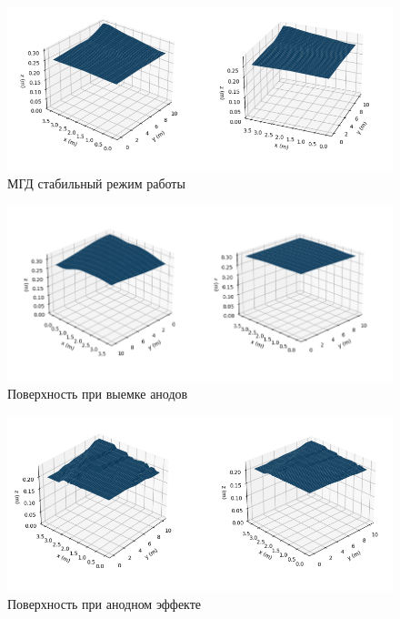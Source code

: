 \documentclass{article}
\begin{document}
\begin{figure}[H]
\hspace*{-5cm}\includegraphics[width=200mm]{спокойная.PNG}
\caption{МГД стабильный режим работы}
\end{figure}

\begin{figure}[H]
\hspace*{-5cm}\includegraphics[width=180mm]{выемка анодов.PNG}
\caption{Поверхность при выемке анодов}
\end{figure}

\begin{figure}[H]
\hspace*{-5cm}\includegraphics[width=180mm]{анодный эффект.PNG}
\caption{Поверхность при анодном эффекте}
\end{figure}
\end{document}
